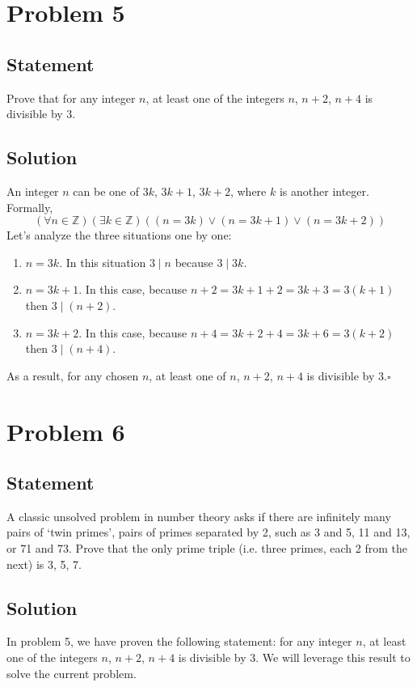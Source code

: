 \documentclass[12pt,letter]{memoir}
\begin{document}
\chapter{Problem 5}
\section*{Statement}
Prove that for any integer $n$, at least one of the integers $n$, $n + 2$, $n + 4$ is divisible by 3.
\section*{Solution}
An integer $n$ can be one of $3k$, $3k+1$, $3k+2$, where $k$ is another integer. Formally,
\begin{equation}\label{3k}
(\forall n \in \mathbb{Z})(\exists k \in \mathbb{Z})((n=3k) \lor (n=3k+1) \lor (n=3k+2))
\end{equation}
Let's analyze the three situations one by one:
\begin{enumerate}
\item $n=3k$. In this situation $3 \mid n$ because $3 \mid 3k$.
\item $n=3k+1$. In this case, because $n+2=3k+1+2=3k+3=3(k+1)$ then $3 \mid (n+2)$.
\item $n=3k+2$. In this case, because $n+4=3k+2+4=3k+6=3(k+2)$ then $3 \mid (n+4)$.
\end{enumerate}
As a result, for any chosen $n$, at least one of $n$, $n + 2$, $n + 4$ is divisible by 3.$\square$

\chapter{Problem 6}
\section*{Statement}
A classic unsolved problem in number theory asks if there are infinitely many pairs of `twin primes', pairs of primes separated by 2, such as 3 and 5, 11 and 13, or 71 and 73. Prove that the only prime triple (i.e. three primes, each 2 from the next) is 3, 5, 7.
\section*{Solution}
In problem 5, we have proven the following statement: for any integer $n$, at least one of the integers $n$, $n + 2$, $n + 4$ is divisible by 3. We will leverage this result to solve the current problem.
\end{document}
